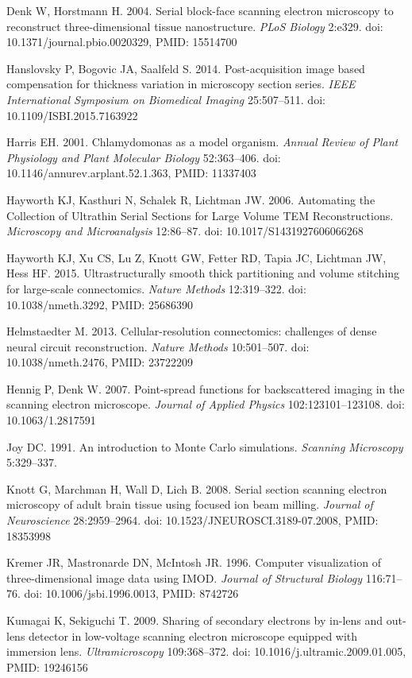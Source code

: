 \documentclass{article}
\begin{document}
\begin{hangpars}
Denk W, Horstmann H. 2004. Serial block-face scanning electron microscopy to reconstruct three-dimensional tissue nanostructure. \emph{PLoS Biology} 2:e329. doi: 10.1371/journal.pbio.0020329, PMID: 15514700

Hanslovsky P, Bogovic JA, Saalfeld S. 2014. Post-acquisition image based compensation for thickness variation in microscopy section series. \emph{IEEE International Symposium on Biomedical Imaging} 25:507–511. doi: 10.1109/ISBI.2015.7163922

Harris EH. 2001. Chlamydomonas as a model organism. \emph{Annual Review of Plant Physiology and Plant Molecular Biology} 52:363–406. doi: 10.1146/annurev.arplant.52.1.363, PMID: 11337403

Hayworth KJ, Kasthuri N, Schalek R, Lichtman JW. 2006. Automating the Collection of Ultrathin Serial Sections for Large Volume TEM Reconstructions. \emph{Microscopy and Microanalysis} 12:86–87. doi: 10.1017/S1431927606066268

Hayworth KJ, Xu CS, Lu Z, Knott GW, Fetter RD, Tapia JC, Lichtman JW, Hess HF. 2015. Ultrastructurally smooth thick partitioning and volume stitching for large-scale connectomics. \emph{Nature Methods} 12:319–322. doi: 10.1038/nmeth.3292, PMID: 25686390

Helmstaedter M. 2013. Cellular-resolution connectomics: challenges of dense neural circuit reconstruction. \emph{Nature Methods} 10:501–507. doi: 10.1038/nmeth.2476, PMID: 23722209

Hennig P, Denk W. 2007. Point-spread functions for backscattered imaging in the scanning electron microscope. \emph{Journal of Applied Physics} 102:123101–123108. doi: 10.1063/1.2817591

Joy DC. 1991. An introduction to Monte Carlo simulations. \emph{Scanning Microscopy} 5:329–337.

Knott G, Marchman H, Wall D, Lich B. 2008. Serial section scanning electron microscopy of adult brain tissue using focused ion beam milling. \emph{Journal of Neuroscience} 28:2959–2964. doi: 10.1523/JNEUROSCI.3189-07.2008, PMID: 18353998

Kremer JR, Mastronarde DN, McIntosh JR. 1996. Computer visualization of three-dimensional image data using IMOD. \emph{Journal of Structural Biology} 116:71–76. doi: 10.1006/jsbi.1996.0013, PMID: 8742726

Kumagai K, Sekiguchi T. 2009. Sharing of secondary electrons by in-lens and out-lens detector in low-voltage scanning electron microscope equipped with immersion lens. \emph{Ultramicroscopy} 109:368–372. doi: 10.1016/j.ultramic.2009.01.005, PMID: 19246156


\end{hangpars}
\end{document}
